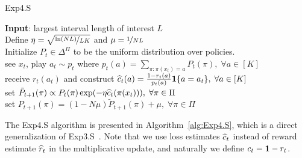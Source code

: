 \LinesNumberedHidden
\begin{algorithm}[H]
\DontPrintSemicolon
\caption{Exp4.S}\label{alg:Exp4.S}
{\bf Input}: largest interval length of interest $L$ \\ 
Define $\eta = \sqrt{\nicefrac{\ln(NL)}{LK}}$ and $\mu = \nicefrac{1}{NL}$ \\
Initialize $P_t \in \Delta^\Pi$ to be the uniform distribution over policies. \\
 {
     see $x_t$, play $a_t \sim p_t$ where $p_t(a) = \sum_{\pi: \pi(x_t) = a} P_t(\pi), \;\forall a\in[K]$ \\
     receive $r_t(a_t)$ and construct $\widehat{c}_t(a) = \frac{1 - r_t(a)}{p_t(a)}\boldsymbol{1}\{a = a_t\}, \;\forall a\in[K]$ \\
     set $\tilde{P}_{t+1}(\pi) \propto P_t(\pi)\exp(-\eta \widehat{c}_t(\pi(x_t))), \;\forall \pi \in \Pi$ \\
     set $P_{t+1}(\pi) = (1-N\mu)\tilde{P}_{t+1}(\pi) + \mu,  \;\forall \pi \in \Pi$ \\
}
\end{algorithm}

The Exp4.S algorithm is presented in Algorithm~\ref{alg:Exp4.S},
which is a direct generalization of Exp3.S~\citep{AuerCeFrSc02}.
Note that we use loss estimates $\widehat{c}_t$ instead of reward estimate $\widehat{r}_t$
in the multiplicative update, and naturally we define $c_t = \boldsymbol{1} - r_t$.

